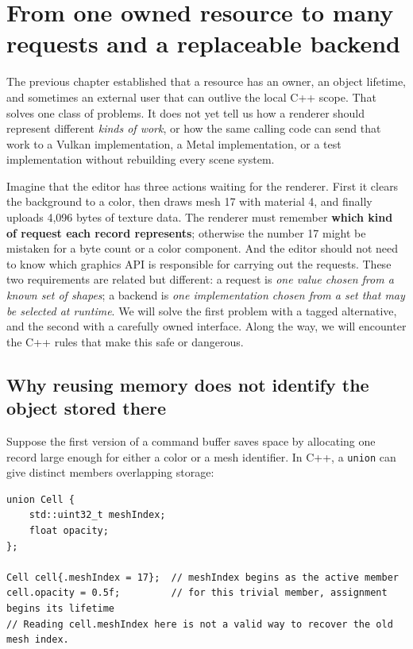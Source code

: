 \section{From one owned resource to many requests and a replaceable backend}\label{05-engine-i-ch004-from-one-owned-resource-to-many-requests-and-a-replaceable-backend}

The previous chapter established that a resource has an owner, an object lifetime, and sometimes an external user that can outlive the local C++ scope. That solves one class of problems. It does not yet tell us how a renderer should represent different \emph{kinds of work}, or how the same calling code can send that work to a Vulkan implementation, a Metal implementation, or a test implementation without rebuilding every scene system.

Imagine that the editor has three actions waiting for the renderer. First it clears the background to a color, then draws mesh 17 with material 4, and finally uploads 4,096 bytes of texture data. The renderer must remember \textbf{which kind of request each record represents}; otherwise the number 17 might be mistaken for a byte count or a color component. And the editor should not need to know which graphics API is responsible for carrying out the requests. These two requirements are related but different: a request is \emph{one value chosen from a known set of shapes}; a backend is \emph{one implementation chosen from a set that may be selected at runtime}. We will solve the first problem with a tagged alternative, and the second with a carefully owned interface. Along the way, we will encounter the C++ rules that make this safe or dangerous.

\subsection{Why reusing memory does not identify the object stored there}\label{05-engine-i-ch004-why-reusing-memory-does-not-identify-the-object-stored-there}

Suppose the first version of a command buffer saves space by allocating one record large enough for either a color or a mesh identifier. In C++, a \texttt{union} can give distinct members overlapping storage:

\begin{verbatim}
union Cell {
    std::uint32_t meshIndex;
    float opacity;
};

Cell cell{.meshIndex = 17};  // meshIndex begins as the active member
cell.opacity = 0.5f;         // for this trivial member, assignment begins its lifetime
// Reading cell.meshIndex here is not a valid way to recover the old mesh index.
\end{verbatim}


